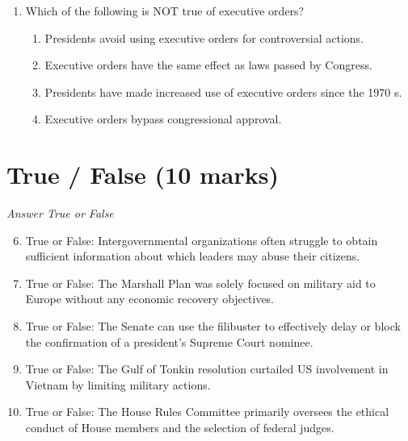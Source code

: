 \documentclass[12pt]{article}
\begin{document}
\begin{enumerate}[label=\arabic*.]
\begin{enumerate}[label=(\alph*)]
    \item Irrationality on the part of the leadership
    \item Costs of free trade are concentrated, but benefits are dispersed
    \item Regime type
    \item International conflict prevents trade
\end{enumerate}
\item Which of the following is NOT true of executive orders?
\begin{enumerate}[label=(\alph*)]
    \item Presidents avoid using executive orders for controversial actions.
    \item Executive orders have the same effect as laws passed by Congress.
    \item Presidents have made increased use of executive orders since the 1970 s.
    \item Executive orders bypass congressional approval.
\end{enumerate}
\end{enumerate}

\section*{True / False (10 marks)}
\textit{Answer True or False}
\begin{enumerate}[label=\arabic*.]
\setcounter{enumi}{5}
\item True or False: Intergovernmental organizations often struggle to obtain sufficient information about which leaders may abuse their citizens.
\item True or False: The Marshall Plan was solely focused on military aid to Europe without any economic recovery objectives.
\item True or False: The Senate can use the filibuster to effectively delay or block the confirmation of a president's Supreme Court nominee.
\item True or False: The Gulf of Tonkin resolution curtailed US involvement in Vietnam by limiting military actions.
\item True or False: The House Rules Committee primarily oversees the ethical conduct of House members and the selection of federal judges.
\end{enumerate}
\end{document}

